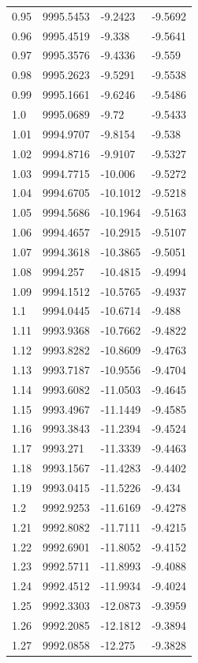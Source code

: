 \begin{table}[H]
\begin{tabular}{llll}
0.95 & 9995.5453 & -9.2423 & -9.5692 \\
0.96 & 9995.4519 & -9.338 & -9.5641 \\
0.97 & 9995.3576 & -9.4336 & -9.559 \\
0.98 & 9995.2623 & -9.5291 & -9.5538 \\
0.99 & 9995.1661 & -9.6246 & -9.5486 \\
1.0 & 9995.0689 & -9.72 & -9.5433 \\
1.01 & 9994.9707 & -9.8154 & -9.538 \\
1.02 & 9994.8716 & -9.9107 & -9.5327 \\
1.03 & 9994.7715 & -10.006 & -9.5272 \\
1.04 & 9994.6705 & -10.1012 & -9.5218 \\
1.05 & 9994.5686 & -10.1964 & -9.5163 \\
1.06 & 9994.4657 & -10.2915 & -9.5107 \\
1.07 & 9994.3618 & -10.3865 & -9.5051 \\
1.08 & 9994.257 & -10.4815 & -9.4994 \\
1.09 & 9994.1512 & -10.5765 & -9.4937 \\
1.1 & 9994.0445 & -10.6714 & -9.488 \\
1.11 & 9993.9368 & -10.7662 & -9.4822 \\
1.12 & 9993.8282 & -10.8609 & -9.4763 \\
1.13 & 9993.7187 & -10.9556 & -9.4704 \\
1.14 & 9993.6082 & -11.0503 & -9.4645 \\
1.15 & 9993.4967 & -11.1449 & -9.4585 \\
1.16 & 9993.3843 & -11.2394 & -9.4524 \\
1.17 & 9993.271 & -11.3339 & -9.4463 \\
1.18 & 9993.1567 & -11.4283 & -9.4402 \\
1.19 & 9993.0415 & -11.5226 & -9.434 \\
1.2 & 9992.9253 & -11.6169 & -9.4278 \\
1.21 & 9992.8082 & -11.7111 & -9.4215 \\
1.22 & 9992.6901 & -11.8052 & -9.4152 \\
1.23 & 9992.5711 & -11.8993 & -9.4088 \\
1.24 & 9992.4512 & -11.9934 & -9.4024 \\
1.25 & 9992.3303 & -12.0873 & -9.3959 \\
1.26 & 9992.2085 & -12.1812 & -9.3894 \\
1.27 & 9992.0858 & -12.275 & -9.3828 \\

\end{tabular}
\end{table}
